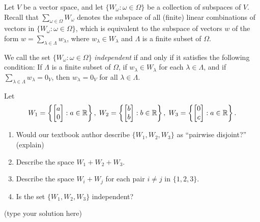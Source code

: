 \begin{ProbBox} %
Let $V$ be a vector space, and let
$\{W_\omega : \omega \in \Omega\}$ be a collection of subspaces of $V$.
Recall that $\sum_{\omega \in \Omega}W_\omega$ denotes the subspace of all
(finite) linear combinations of vectors in $\{W_\omega : \omega \in \Omega\}$,
which is equivalent to the subspace of vectors $w$ of the form
$w = \sum_{\lambda \in \Lambda}w_\lambda$, where $w_\lambda \in W_\lambda$ and
$\Lambda$ is a finite subset of $\Omega$.

We call the set $\{W_\omega : \omega \in \Omega\}$ \emph{independent} if and
only if it satisfies the following condition:
If $\Lambda$ is a finite subset of $\Omega$, if $w_\lambda \in W_\lambda$ for
each $\lambda \in \Lambda$, and if $\sum_{\lambda\in \Lambda} w_\lambda = 0_V$,
then $w_\lambda = 0_V$ for all $\lambda \in \Lambda$.


\begin{problem}
Let 
\[W_1 = \left\{\begin{bmatrix}  a \\ 0\end{bmatrix} : a\in \mathbb{R} \right\},  \;
W_2 = \left\{\begin{bmatrix}  b \\ b\end{bmatrix} : b\in \mathbb{R}\right\}, \; 
W_3 = \left\{\begin{bmatrix}  0 \\ c\end{bmatrix} : a\in \mathbb{R}\right\}.
\]  

\begin{enumerate}
\item Would our textbook author describe $\{W_1, W_2, W_3\}$ as ``pairwise disjoint?'' (explain)
\item 
Describe the space $W_1 + W_2 + W_3$.
\item Describe the space $W_i + W_j$ for each pair $i\neq j$ in $\{1,2,3\}$.  
\item Is the set $\{W_1, W_2, W_3\}$ independent?
\end{enumerate}
\end{problem}
\end{ProbBox}
\smallskip
\begin{solution}
(type your solution here)
\end{solution}

